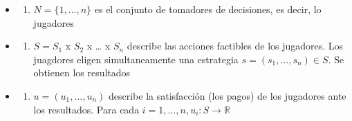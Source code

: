 \documentclass[12pt,a4paper,]{book}
\providecommand{\tightlist}{%
  \setlength{\itemsep}{0pt}\setlength{\parskip}{0pt}}
\numberwithin{dummy}{section}
\theoremstyle{ocrenumbox}
\theoremstyle{blacknumex}
\theoremstyle{blacknumbox}
\theoremstyle{ocrenum}
\theoremstyle{ocrenum}
\begin{document}
\begin{itemize}
\tightlist
\item
  \begin{enumerate}
  \def\labelenumi{\arabic{enumi}.}
  \tightlist
  \item
    \(N = \{1, \ldots, n\}\) es el conjunto de tomadores de decisiones,
    es decir, lo jugadores
  \end{enumerate}
\item
  \begin{enumerate}
  \def\labelenumi{\arabic{enumi}.}
  \setcounter{enumi}{1}
  \tightlist
  \item
    \(S = S_1\) x \(S_2\) x \ldots{} x \(S_n\) describe las acciones
    factibles de los jugadores. Los juagdores eligen simultaneamente una
    estrategia \(s = (s_1, \ldots, s_n) \in S\). Se obtienen los
    resultados
  \end{enumerate}
\item
  \begin{enumerate}
  \def\labelenumi{\arabic{enumi}.}
  \setcounter{enumi}{2}
  \tightlist
  \item
    \(u = (u_1, \ldots, u_n)\) describe la satisfacción (los pagos) de
    los jugadores ante los resultados. Para cada
    \(i = 1, \ldots, n, u_i : S \to \mathbb{R}\)
  \end{enumerate}
\end{itemize}
\end{document}
